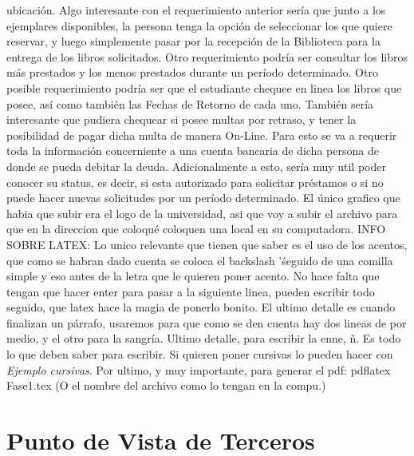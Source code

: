 \documentclass[12pt,a4paper,spanish]{article}
\begin{document}
ubicaci\'on. Algo interesante con el requerimiento anterior ser\'ia
que junto a los ejemplares disponibles, la persona tenga la opci\'on
de seleccionar los que quiere reservar, y luego simplemente pasar por
la recepci\'on de la Biblioteca para la entrega de los libros
solicitados.
\newline
\newline
\indent Otro requerimiento podr\'ia ser consultar los libros
m\'as prestados y los menos prestados durante un per\'iodo
determinado. 
\newline
\newline
\indent Otro posible requerimiento podr\'ia ser que el estudiante
chequee en linea los libros que posee, as\'i como tambi\'en las Fechas
de Retorno de cada uno. Tambi\'en ser\'ia interesante que pudiera
chequear si posee multas por retraso, y tener la posibilidad de pagar
dicha multa de manera On-Line. Para esto se va a requerir toda la
informaci\'on concerniente a una cuenta bancaria de dicha persona de
donde se pueda debitar la deuda. Adicionalmente a esto, ser\'ia muy
util poder conocer su status, es decir, si esta autorizado para
solicitar pr\'estamos o si no puede hacer nuevas solicitudes por un
per\'iodo determinado.
\newline
\newline
El \'unico grafico que habia que subir era el logo de la universidad,
asi que voy a subir el archivo para que en la direccion que coloqu\'e
coloquen una local en su computadora.
INFO SOBRE LATEX: 
\newline
Lo unico relevante que tienen que saber es el uso de los acentos, que
como se habran dado cuenta se coloca el backslash '\' seguido de una
comilla simple y eso antes de la letra que le quieren poner acento. No
hace falta que tengan que hacer enter para pasar a la siguiente linea,
pueden escribir todo seguido, que latex hace la magia de ponerlo
bonito. El ultimo detalle es cuando finalizan un p\'arrafo, usaremos
\newline
\newline
\indent para que como se den cuenta hay dos lineas de por medio, y el
otro para la sangr\'ia. Ultimo detalle, para escribir la enne,
\~n. Es todo lo que deben saber para escribir. Si quieren poner
cursivas lo pueden hacer con \emph{Ejemplo cursivas}. Por ultimo, y
muy importante, para generar el pdf: pdflatex Fase1.tex (O el nombre
del archivo como lo tengan en la compu.)

\newpage
\section{Punto de Vista de Terceros}
\end{document}
